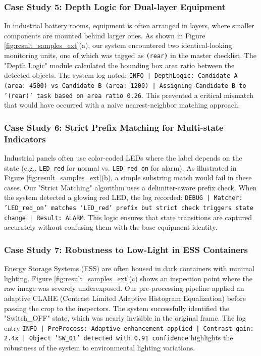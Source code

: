 \subsubsection{Case Study 5: Depth Logic for Dual-layer Equipment}
In industrial battery rooms, equipment is often arranged in layers, where smaller components are mounted behind larger ones. As shown in Figure \ref{fig:result_samples_ext}(a), our system encountered two identical-looking monitoring units, one of which was tagged as \texttt{(rear)} in the master checklist. The "Depth Logic" module calculated the bounding box area ratio between the detected objects. The system log noted: \texttt{INFO | DepthLogic: Candidate A (area: 4500) vs Candidate B (area: 1200) | Assigning Candidate B to '(rear)' task based on area ratio 0.26}. This prevented a critical mismatch that would have occurred with a naive nearest-neighbor matching approach.

\subsubsection{Case Study 6: Strict Prefix Matching for Multi-state Indicators}
Industrial panels often use color-coded LEDs where the label depends on the state (e.g., \texttt{LED_red} for normal vs. \texttt{LED_red_on} for alarm). As illustrated in Figure \ref{fig:result_samples_ext}(b), a simple substring match would fail in these cases. Our "Strict Matching" algorithm uses a delimiter-aware prefix check. When the system detected a glowing red LED, the log recorded: \texttt{DEBUG | Matcher: 'LED_red_on' matches 'LED_red' prefix but strict check triggers state change | Result: ALARM}. This logic ensures that state transitions are captured accurately without confusing them with the base equipment identity.

\subsubsection{Case Study 7: Robustness to Low-Light in ESS Containers}
Energy Storage Systems (ESS) are often housed in dark containers with minimal lighting. Figure \ref{fig:result_samples_ext}(c) shows an inspection point where the raw image was severely underexposed. Our pre-processing pipeline applied an adaptive CLAHE (Contrast Limited Adaptive Histogram Equalization) before passing the crop to the inspectors. The system successfully identified the "Switch_OFF" state, which was nearly invisible in the original frame. The log entry \texttt{INFO | PreProcess: Adaptive enhancement applied | Contrast gain: 2.4x | Object 'SW_01' detected with 0.91 confidence} highlights the robustness of the system to environmental lighting variations.

